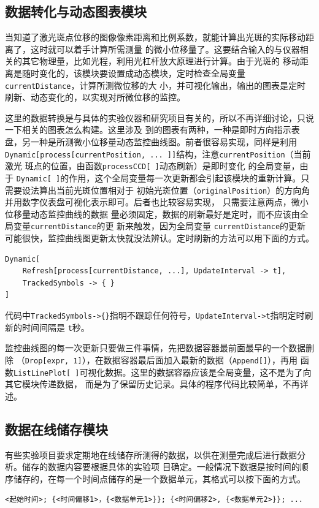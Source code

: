 \documentclass[UTF8,a4paper,12pt]{article}
\begin{document}
\subsection{数据转化与动态图表模块}
当知道了激光斑点位移的图像像素距离和比例系数，就能计算出光斑的实际移动距离了，这时就可以着手计算所需测量
的微小位移量了。这要结合输入的与仪器相关的其它物理量，比如光程，利用光杠杆放大原理进行计算。由于光斑的
移动距离是随时变化的，该模块要设置成动态模块，定时检查全局变量\verb|currentDistance|，计算所测微位移的大
小，并可视化输出，输出的图表是定时刷新、动态变化的，以实现对所微位移的监控。

这里的数据转换是与具体的实验仪器和研究项目有关的，所以不再详细讨论，只说一下相关的图表怎么构建。这里涉及
到的图表有两种，一种是即时方向指示表盘，另一种是所测微小位移量动态监控曲线图。前者很容易实现，同样是利用
\verb|Dynamic[process[currentPosition, ... ]]|结构，注意\verb|currentPosition|（当前激光
斑点的位置，由函数\verb|processCCD[ ]|动态刷新）是即时变化
的全局变量，由于
\verb|Dynamic[ ]|的作用，这个全局变量每一次更新都会引起该模块的重新计算。只需要设法算出当前光斑位置相对于
初始光斑位置（\verb|originalPosition|）的方向角并用数字仪表盘可视化表示即可。后者也比较容易实现，
只需要注意两点，微小位移量动态监控曲线的数据
量必须固定，数据的刷新最好是定时，而不应该由全局变量\verb|currentDistance|的更
新来触发，因为全局变量
\verb|currentDistance|的更新可能很快，监控曲线图更新太快就没法辨认。定时刷新的方法可以用下面的方式。
\begin{verbatim}
Dynamic[
    Refresh[process[currentDistance, ...], UpdateInterval -> t], 
    TrackedSymbols -> { }
]
\end{verbatim}

代码中\verb|TrackedSymbols->{}|指明不跟踪任何符号，\verb|UpdateInterval->t|指明定时刷新的时间间隔是
\verb|t|秒。

监控曲线图的每一次更新只要做三件事情，先把数据容器最前面最早的一个数据删除
（\verb|Drop[expr, 1]|），在数据容器最后面加入最新的数据（\verb|Append[]|），再用
函数\verb|ListLinePlot[ ]|可视化数据。这里的数据容器应该是全局变量，这不是为了向其它模块传递数据，
而是为了保留历史记录。具体的程序代码比较简单，不再详述。

\subsection{数据在线储存模块}
有些实验项目要求定期地在线储存所测得的数据，以供在测量完成后进行数据分析。储存的数据内容要根据具体的实验项
目确定。一般情况下数据是按时间的顺序储存的，在每一个时间点储存的是一个数据单元，其格式可以按下面的方式。
\begin{verbatim}
<起始时间>; {<时间偏移1>，{<数据单元1>}}; {<时间偏移2>, {<数据单元2>}}; ...
\end{verbatim}
\end{document}
